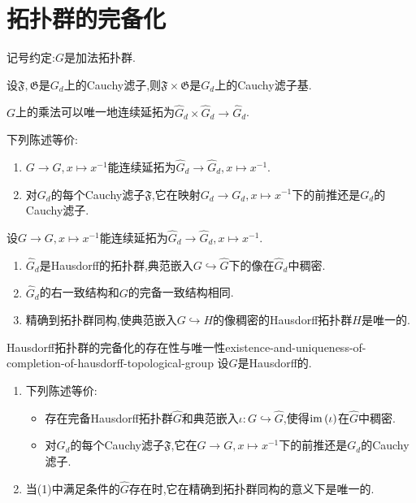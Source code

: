 \section{拓扑群的完备化}

记号约定:$G$是加法拓扑群.

\begin{proposition}{}{}
	设$\mathfrak{F},\mathfrak{G}$是$G_{d}$上的Cauchy滤子,则$\mathfrak{F}\times\mathfrak{G}$是$G_{d}$上的Cauchy滤子基.
\end{proposition}

\begin{corollary}{}{}
	$G$上的乘法可以唯一地连续延拓为$\hat{G}_{d}\times\hat{G}_{d}\to\hat{G}_{d}$.
\end{corollary}

\begin{proposition}{}{}
	下列陈述等价:
	\begin{enumerate}
		\item $G\to G,x\mapsto x^{-1}$能连续延拓为$\hat{G}_{d}\to\hat{G}_{d},x\mapsto x^{-1}$.
		\item 对$G_{d}$的每个Cauchy滤子$\mathfrak{F}$,它在映射$G_{d}\to G_{d},x\mapsto x^{-1}$下的前推还是$G_{d}$的Cauchy滤子.
	\end{enumerate}
\end{proposition}

\begin{theorem}{}{}
	设$G\to G,x\mapsto x^{-1}$能连续延拓为$\hat{G}_{d}\to\hat{G}_{d},x\mapsto x^{-1}$.
	\begin{enumerate}
		\item $\hat{G}_{d}$是Hausdorff的拓扑群,典范嵌入$G\hookrightarrow\hat{G}$下的像在$\hat{G}_{d}$中稠密.
		\item $\hat{G}_{d}$的右一致结构和$G$的完备一致结构相同.
		\item 精确到拓扑群同构,使典范嵌入$G\hookrightarrow H$的像稠密的Hausdorff拓扑群$H$是唯一的.
	\end{enumerate}
\end{theorem}

\begin{theorem}{Hausdorff拓扑群的完备化的存在性与唯一性}{existence-and-uniqueness-of-completion-of-hausdorff-topological-group}
	设$G$是Hausdorff的.
	\begin{enumerate}
		\item 下列陈述等价:
		\begin{itemize}
			\item 存在完备Hausdorff拓扑群$\hat{G}$和典范嵌入$\iota:G\hookrightarrow\hat{G}$,使得$\operatorname{im}\left(\iota\right)$在$\hat{G}$中稠密.
			\item 对$G_{d}$的每个Cauchy滤子$\mathfrak{F}$,它在$G\to G,x\mapsto x^{-1}$下的前推还是$G_{d}$的Cauchy滤子.
		\end{itemize}
		\item 当(1)中满足条件的$\hat{G}$存在时,它在精确到拓扑群同构的意义下是唯一的.
	\end{enumerate}
\end{theorem}

